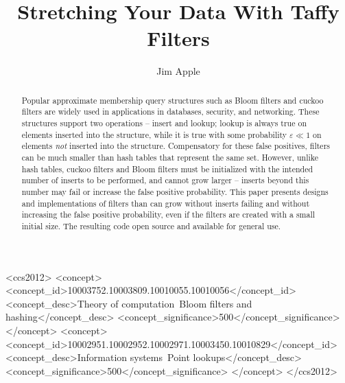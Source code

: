 \documentclass[sigconf, nonacm]{acmart}
\begin{document}
\title{Stretching Your Data With Taffy Filters}
\author{Jim Apple}

\begin{abstract}
\end{abstract}

\begin{CCSXML}
<ccs2012>
   <concept>
       <concept_id>10003752.10003809.10010055.10010056</concept_id>
       <concept_desc>Theory of computation~Bloom filters and hashing</concept_desc>
       <concept_significance>500</concept_significance>
   </concept>
   <concept>
       <concept_id>10002951.10002952.10002971.10003450.10010829</concept_id>
       <concept_desc>Information systems~Point lookups</concept_desc>
       <concept_significance>500</concept_significance>
   </concept>
 </ccs2012>
\end{CCSXML}





\begin{abstract}
Popular approximate membership query structures such as Bloom filters and cuckoo filters are widely used in applications in databases, security, and networking.
These structures support two operations -- insert and lookup; lookup is always true on elements inserted into the structure, while it is true with some probability $\varepsilon \ll 1$ on elements {\em not} inserted into the structure.
Compensatory for these false positives, filters can be much smaller than hash tables that represent the same set.
However, unlike hash tables, cuckoo filters and Bloom filters must be initialized with the intended number of inserts to be performed, and cannot grow larger --
inserts beyond this number may fail or increase the false positive probability.
This paper presents designs and implementations of filters than can grow without inserts failing and without increasing the false positive probability, even if the filters are created with a small initial size.
The resulting code open source and available for general use.
\end{abstract}
\end{document}
